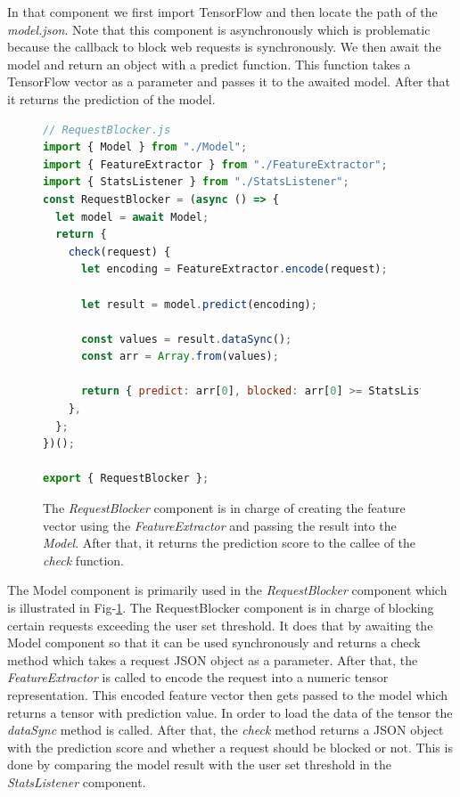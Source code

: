 In that component we first import TensorFlow and then locate the path of the \emph{model.json}. Note that this component is asynchronously
which is problematic because the callback to block web requests is synchronously. We then await the model and return an object with a predict function.
This function takes a TensorFlow vector as a parameter and passes it to the awaited model. After that it returns the prediction of the model.

\begin{figure}[ht!]
  \begin{lstlisting}[language=JavaScript]
// RequestBlocker.js
import { Model } from "./Model";
import { FeatureExtractor } from "./FeatureExtractor";
import { StatsListener } from "./StatsListener";
const RequestBlocker = (async () => {
  let model = await Model;
  return {
    check(request) {
      let encoding = FeatureExtractor.encode(request);

      let result = model.predict(encoding);

      const values = result.dataSync();
      const arr = Array.from(values);

      return { predict: arr[0], blocked: arr[0] >= StatsListener.getRate() };
    },
  };
})();

export { RequestBlocker };
\end{lstlisting}
\caption{The \emph{RequestBlocker} component is in charge of creating the feature vector using the \emph{FeatureExtractor} and passing the 
result into the \emph{Model}. After that, it returns the prediction score to the callee of the \emph{check} function.}
\label{fig:blocker}
\end{figure}
The Model component is primarily used in the \emph{RequestBlocker} component which is illustrated in Fig-\ref{fig:blocker}. The RequestBlocker
component is in charge of blocking certain requests exceeding the user set threshold. It does that by awaiting the Model component so that 
it can be used synchronously and returns a check method which takes a request JSON object as a parameter. After that, the \emph{FeatureExtractor}
is called to encode the request into a numeric tensor representation. This encoded feature vector then gets passed to the model which returns
a tensor with prediction value. In order to load the data of the tensor the \emph{dataSync} method is called. After that, the \emph{check}
method returns a JSON object with the prediction score and whether a request should be blocked or not. This is done by comparing the model result
with the user set threshold in the \emph{StatsListener} component.
